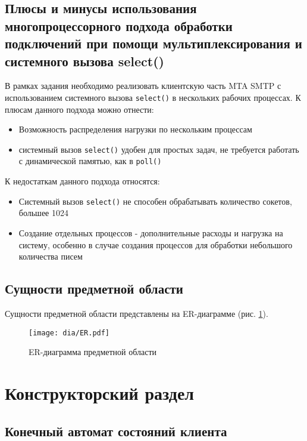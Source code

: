 \documentclass[a4paper,12pt]{report}
\begin{document}
\section{Плюсы и минусы использования многопроцессорного подхода обработки подключений при помощи мультиплексирования и системного вызова select()}

В рамках задания необходимо реализовать клиентскую часть MTA SMTP с использованием системного вызова \texttt{select()} в нескольких рабочих процессах. К плюсам данного подхода можно отнести:
\begin{itemize}
    \item Возможность распределения нагрузки по нескольким процессам
    \item системный вызов \texttt{select()} удобен для простых задач, не требуется работать с динамической памятью, как в  \texttt{poll()}
\end{itemize}

К недостаткам данного подхода относятся:
\begin{itemize}
    \item Системный вызов \texttt{select()} не способен обрабатывать количество сокетов, большее 1024
    \item Создание отдельных процессов - дополнительные расходы и нагрузка на систему, особенно в случае создания процессов для обработки небольшого количества писем
\end{itemize}


\section{Сущности предметной области}

Сущности предметной области представлены на ER-диаграмме (рис. \ref{fig:er}).

\begin{figure}
    \centering
    \texttt{[image: dia/ER.pdf]}
    \caption{ER-диаграмма предметной области}
    \label{fig:er}
\end{figure}


\chapter{Конструкторский раздел}


\section{Конечный автомат состояний клиента}
\end{document}
